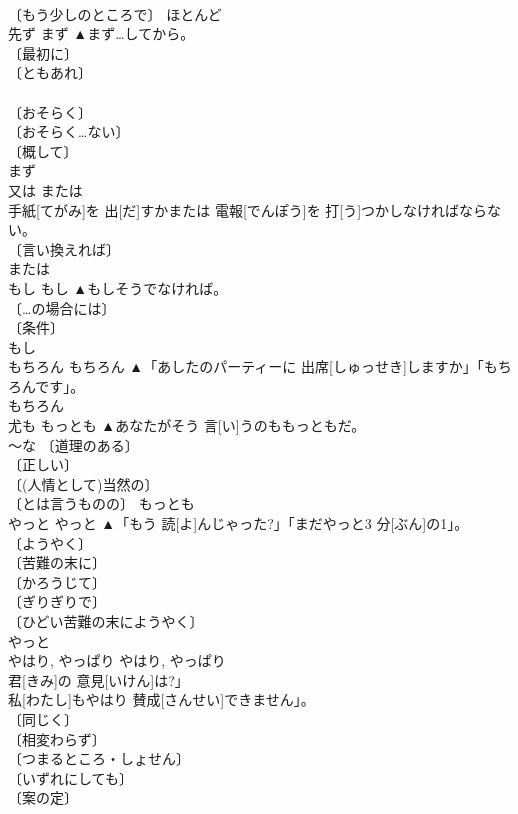 \documentclass[8pt]{extreport}
\begin{document}
\begin{CJK}{UTF8}{min}
\\	〔もう少しのところで〕		ほとんど	
\\	先ず	まず	▲まず…してから。	
\\	〔最初に〕 
\\	〔ともあれ〕 
\\	[⇒ひとまず] 
\\	〔おそらく〕 
\\	〔おそらく…ない〕 
\\	〔概して〕 
\\	まず	
\\	又は	または	
\\	手紙[てがみ]を 出[だ]すかまたは 電報[でんぽう]を 打[う]つかしなければならない。	
\\	〔言い換えれば〕 
\\	または	
\\	もし	もし	▲もしそうでなければ。	
\\	〔…の場合には〕 
\\	〔条件〕 
\\	もし	
\\	もちろん	もちろん	▲「あしたのパーティーに 出席[しゅっせき]しますか」「もちろんです」。	
\\	もちろん	
\\	尤も	もっとも	▲あなたがそう 言[い]うのももっともだ。	
\\	～な 〔道理のある〕 
\\	〔正しい〕 
\\	〔(人情として)当然の〕 
\\	〔とは言うものの〕		もっとも	
\\	やっと	やっと	▲「もう 読[よ]んじゃった?」「まだやっと3 分[ぶん]の1」。	
\\	〔ようやく〕 
\\	〔苦難の末に〕 
\\	〔かろうじて〕 
\\	〔ぎりぎりで〕 
\\	〔ひどい苦難の末にようやく〕 
\\	やっと	
\\	やはり, やっぱり	やはり, やっぱり	
\\	君[きみ]の 意見[いけん]は?」
\\	私[わたし]もやはり 賛成[さんせい]できません」。	
\\	〔同じく〕 
\\	〔相変わらず〕 
\\	〔つまるところ・しょせん〕 
\\	〔いずれにしても〕 
\\	〔案の定〕 

\end{CJK}
\end{document}
